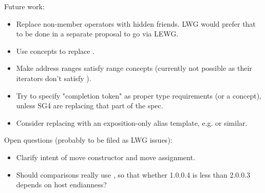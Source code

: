 Future work:
\begin{itemize}
\item
Replace non-member operators with hidden friends.
LWG would prefer that to be done in a separate proposal to go via LEWG.
\item
Use concepts to replace .
\item
Make address ranges satisfy range concepts (currently not possible as
their iterators don't satisfy ).
\item
Try to specify "completion token" as proper type requirements (or a concept),
unless SG4 are replacing that part of the spec.
\item
Consider replacing  with an exposition-only alias template,
e.g. 
or similar.
\end{itemize}

Open questions (probably to be filed as LWG issues):
\begin{itemize}
\item
Clarify intent of  move constructor and move assignment.
\item
Should  comparisons really use ,
so that whether 1.0.0.4 is less than 2.0.0.3 depends on host endianness?
\end{itemize}


\newpage


{}
\hypertarget{toctarget}{\tableofcontents*}

\setcounter{tocdepth}{5}

%
